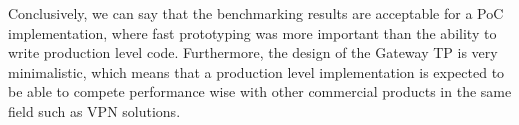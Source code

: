 Conclusively, we can say that the benchmarking results are acceptable for a \acs{PoC} implementation, where fast prototyping was more important than the ability to write production level code. Furthermore, the design of the Gateway \acs{TP} is very minimalistic, which means that a production level implementation is expected to be able to compete performance wise with other commercial products in the same field such as \acs{VPN} solutions. 


